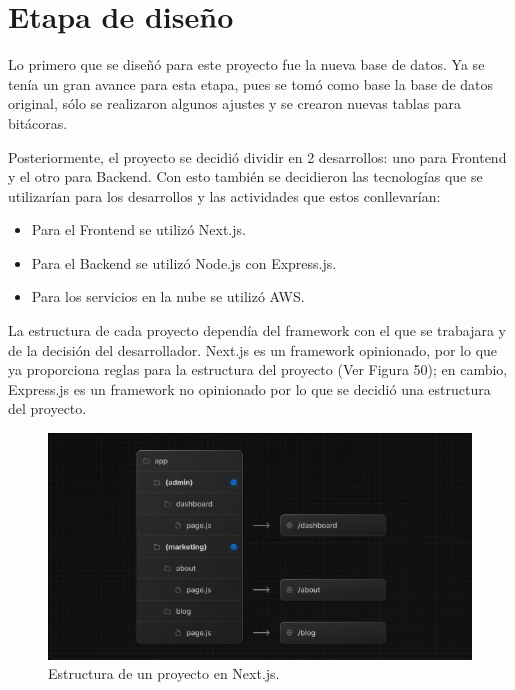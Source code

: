 \section{Etapa de diseño}
Lo primero que se diseñó para este proyecto fue la nueva base de datos. Ya se tenía un gran avance para esta etapa, pues se tomó como base la base de datos original, sólo se realizaron algunos ajustes y se crearon nuevas tablas para bitácoras.

Posteriormente, el proyecto se decidió dividir en 2 desarrollos: uno para Frontend y el otro para Backend. Con esto también se decidieron las tecnologías que se utilizarían para los desarrollos y las actividades que estos conllevarían:
    \begin{itemize}
        \item Para el Frontend se utilizó Next.js.
        \item Para el Backend se utilizó Node.js con Express.js.
        \item Para los servicios en la nube se utilizó AWS.\@
    \end{itemize}

La estructura de cada proyecto dependía del framework con el que se trabajara y de la decisión del desarrollador. Next.js es un framework opinionado, por lo que ya proporciona reglas para la estructura del proyecto (Ver Figura 50); en cambio, Express.js es un framework no opinionado por lo que se decidió una estructura del proyecto.

    \begin{figure}[H]
        \begin{center}
            \includegraphics[scale=0.60]{img/resultados/nextjs-structure.png}
            \caption{Estructura de un proyecto en Next.js.}
            \label{fig:nextjs-estructura}
        \end{center}
    \end{figure}


